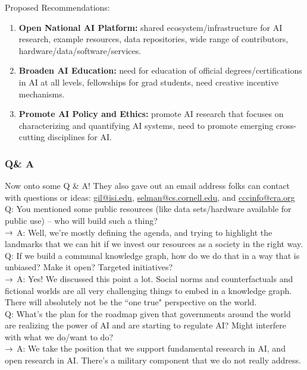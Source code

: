 Proposed Recommendations:
\begin{enumerate}
    \item {\bf Open National AI Platform:} shared ecosystem/infrastructure for AI research, example resources, data repositories, wide range of contributors, hardware/data/software/services.
    \item {\bf Broaden AI Education:} need for education of official degrees/certifications in AI at all levels, fellowships for grad students, need creative incentive mechanisms.
    \item {\bf Promote AI Policy and Ethics:} promote AI research that focuses on characterizing and quantifying AI systems, need to promote emerging cross-cutting disciplines for AI.
\end{enumerate}


\subsubsection{Q\& A}
Now onto some Q \& A! They also gave out an email address folks can contact with questions or ideas: \url{gil@isi.edu}, \url{selman@cs.cornell.edu}, and \url{cccinfo@cra.org} \\

Q: You mentioned some public resources (like data sets/hardware available for public use) -- who will build such a thing? \\

$\rightarrow$ A: Well, we're mostly defining the agenda, and trying to highlight the landmarks that we can hit if we invest our resources as a society in the right way. \\

Q: If we build a communal knowledge graph, how do we do that in a way that is unbiased? Make it open? Targeted initiatives? \\

$\rightarrow$ A: Yes! We discussed this point a lot. Social norms and counterfactuals and fictional worlds are all very challenging things to embed in a knowledge graph. There will absolutely not be the ``one true" perspective on the world. \\

Q: What's the plan for the roadmap given that governments around the world are realizing the power of AI and are starting to regulate AI? Might interfere with what we do/want to do? \\

$\rightarrow$ A: We take the position that we support fundamental research in AI, and open research in AI. There's a military component that we do not really address. 

